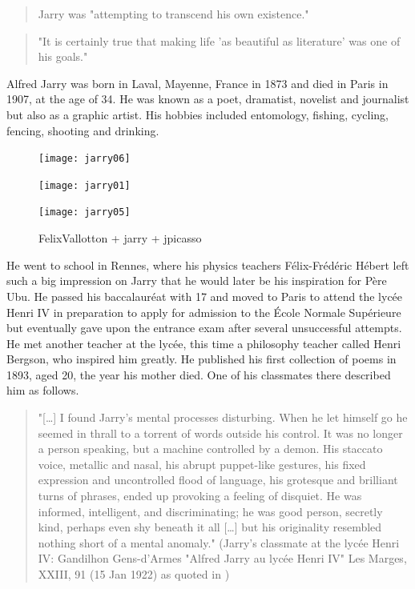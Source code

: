 \begin{quote}
  Jarry was "attempting to transcend his own existence." \citep{Hugill2012}
\end{quote}

\begin{quote}
  "It is certainly true that making life 'as beautiful as literature' was one of his goals." \citep{Hugill2012}
\end{quote}

Alfred Jarry was born in Laval, Mayenne, France in 1873 and died in Paris in 1907, at the age of 34. He was known as a poet, dramatist, novelist and journalist but also as a graphic artist. His hobbies included entomology, fishing, cycling, fencing, shooting and drinking.

\begin{figure}[htb]
  \centering
  \begin{minipage}{.275\linewidth}
    \texttt{[image: jarry06]}
  \end{minipage}
  \hspace{.05\linewidth}
  \begin{minipage}{.275\linewidth}
    \texttt{[image: jarry01]}
  \end{minipage}
  \hspace{.05\linewidth}
  \begin{minipage}{.275\linewidth}
    \texttt{[image: jarry05]}
  \end{minipage}
  \caption[figures1-3]{FelixVallotton + jarry + jpicasso}
  \label{img123}
\end{figure}

He went to school in Rennes, where his physics teachers Félix-Frédéric Hébert left such a big impression on Jarry that he would later be his inspiration for Père Ubu. He passed his baccalauréat with 17 and moved to Paris to attend the lycée Henri IV in preparation to apply for admission to the École Normale Supérieure but eventually gave upon the entrance exam after several unsuccessful attempts. He met another teacher at the lycée, this time a philosophy teacher called Henri Bergson, who inspired him greatly. He published his first collection of poems in 1893, aged 20, the year his mother died. One of his classmates there described him as follows.

\begin{quote}
  "[…] I found Jarry's mental processes disturbing. When he let himself go he seemed in thrall to a torrent of words outside his control. It was no longer a person speaking, but a machine controlled by a demon. His staccato voice, metallic and nasal, his abrupt puppet-like gestures, his fixed expression and uncontrolled flood of language, his grotesque and brilliant turns of phrases, ended up provoking a feeling of disquiet. He was informed, intelligent, and discriminating; he was good person, secretly kind, perhaps even shy beneath it all […] but his originality resembled nothing short of a mental anomaly." (Jarry's classmate at the lycée Henri IV: Gandilhon Gens-d'Armes "Alfred Jarry au lycée Henri IV" Les Marges, XXIII, 91 (15 Jan 1922) as quoted in \citep{Brotchie2011})
\end{quote}

